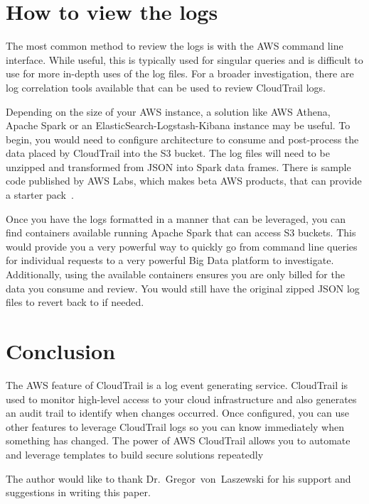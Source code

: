 \section{How to view the logs}

The most common method to review the logs is with the AWS command line interface. 
While useful, this is typically used for singular queries and is difficult to
use for more in-depth uses of the log files. For a broader investigation, there
are log correlation tools available that can be used to review CloudTrail logs.

Depending on the size of your AWS instance, a solution like AWS Athena, Apache 
Spark or an ElasticSearch-Logstash-Kibana instance may be useful. To begin, you
would need to configure architecture to consume and post-process the data 
placed by CloudTrail into the S3 bucket. The log files will need to be unzipped
and transformed from JSON into Spark data frames. There is sample code published
by AWS Labs, which makes beta AWS products, that can provide a 
starter pack~\cite{hid-sp18-518-CloudTrail-timely}.

Once you have the logs formatted in a manner that can be leveraged, you can
find containers available running Apache Spark that can access S3 buckets. This
would provide you a very powerful way to quickly go from command line queries
for individual requests to a very powerful Big Data platform to investigate. 
Additionally, using the available containers ensures you are only billed for
the data you consume and review. You would still have the original zipped JSON
log files to revert back to if needed.

\section{Conclusion}

The AWS feature of CloudTrail is a log event generating service. CloudTrail 
is used to monitor high-level access to your cloud infrastructure and also 
generates an audit trail to identify when changes occurred. Once configured, you 
can use other features to leverage CloudTrail logs so you can know immediately 
when something has changed. The power of AWS CloudTrail allows you to automate and 
leverage templates to build secure solutions repeatedly

\begin{acks}

The author would like to thank Dr.~Gregor~von~Laszewski for his support and 
suggestions in writing this paper.

\end{acks}


 

